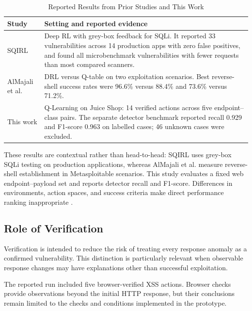 \documentclass[conference]{IEEEtran}
\begin{document}
\begin{table}[!t]
\caption{Reported Results from Prior Studies and This Work}
\label{tab:prior-comparison}
\centering
\footnotesize
\setlength{\tabcolsep}{3pt}
\begin{tabular}{p{} p{}}
\toprule
\textbf{Study} & \textbf{Setting and reported evidence}\\
\midrule
SQIRL \cite{sqirl2023} & Deep RL with grey-box feedback for SQLi. It reported 33 vulnerabilities across 14 production apps with zero false positives, and found all microbenchmark vulnerabilities with fewer requests than most compared scanners.\\
AlMajali et al. \cite{almajali2024} & DRL versus Q-table on two exploitation scenarios. Best reverse-shell success rates were 96.6\% versus 88.4\% and 73.6\% versus 71.2\%.\\
This work & Q-Learning on Juice Shop: 14 verified actions across five endpoint--class pairs. The separate detector benchmark reported recall 0.929 and F1-score 0.963 on labelled cases; 46 unknown cases were excluded.\\
\bottomrule
\end{tabular}
\end{table}
\setlength{\tabcolsep}{6pt}

These results are contextual rather than head-to-head: SQIRL
uses grey-box SQLi testing on production applications, whereas
AlMajali et al. measure reverse-shell establishment in
Metasploitable scenarios. This study evaluates a fixed web
endpoint--payload set and reports detector recall and F1-score.
Differences in environments, action spaces, and success criteria
make direct performance ranking inappropriate \cite{sok2024}.

\subsection{Role of Verification}

Verification is intended to reduce the risk of treating
every response anomaly as a confirmed vulnerability.
This distinction is particularly relevant when observable
response changes may have explanations other than
successful exploitation.

The reported run included five browser-verified XSS
actions. Browser checks provide observations beyond the
initial HTTP response, but their conclusions remain
limited to the checks and conditions implemented in
the prototype.
\end{document}
